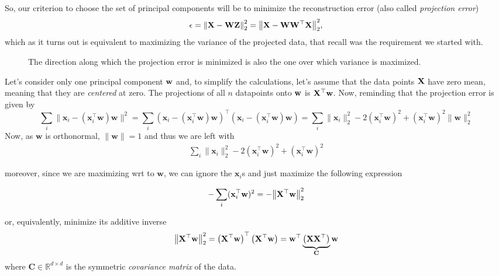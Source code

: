 So, our criterion to choose the set of principal components will be to minimize the reconstruction error (also called \emph{projection error})
\begin{equation}
    \epsilon = \norm{ \vb{X} - \mathbf{W}\mathbf{Z} }_2^2 = \norm{\vb{X} - \vb{W}\vb{W}^{\top} \vb{X}}_2^2,
\end{equation}
which as it turns out is equivalent to maximizing the variance of the projected data, that recall was the requirement we started with.

\begin{figure}[H]
    \centering
    \caption{The direction along which the projection error is minimized is also the one over which variance is maximized.}
\end{figure}

Let's consider only one principal component $\vb{w}$ and, to simplify the calculations, let's assume that the data points $\vb{X}$ have zero mean, meaning that they are \emph{centered} at zero. The projections of all $n$ datapoints onto $\vb{w}$ is $\vb{X}^{\top} \vb{w}$. Now, reminding that the projection error is given by 
\begin{equation}
	\sum_{i} \|\mathbf{x}_i - \left(\mathbf{x}_i^\top \mathbf{w}\right)\mathbf{w}\|^2 = \sum_i (\mathbf{x}_i - \left(\mathbf{x}_i^\top \mathbf{w}\right)\mathbf{w})^\top (\mathbf{x}_i - \left(\mathbf{x}_i^\top \mathbf{w}\right)\mathbf{w}) = \sum_i \| \mathbf{x}_i \|_2^{2} - 2(\mathbf{x}_i^\top \mathbf{w})^2 + (\mathbf{x}_i ^ \top \mathbf{w})^2\| \mathbf{w}\|_2^2
\end{equation}
Now, as $\mathbf{w}$ is orthonormal, $\| \mathbf{w}\| = 1$ and thus we are left with
\begin{align}
	\sum_i \| \mathbf{x}_i \|_2^{2} - 2(\mathbf{x}_i^\top \mathbf{w})^2 + (\mathbf{x}_i ^ \top \mathbf{w})^2 
\end{align}

moreover, since we are maximizing wrt to $\mathbf{w}$, we can ignore the $\mathbf{x}_i$s and just maximize the following expression

\begin{equation}
	- \sum_{i} (\mathbf{x}_i^\top \mathbf{w})^2 = -\norm{\vb{X}^{\top} \vb{\mathbf{w}}}_2^2
\end{equation}

or, equivalently, minimize its additive inverse
\begin{equation}
	\norm{\vb{X}^{\top} \vb{w}}_2^2 = \left( \mathbf{X}^\top \mathbf{w} \right)^\top \left( \mathbf{X}^\top \mathbf{w} \right) = \mathbf{w}^\top \underbrace{\left( \mathbf{X}\mathbf{X}^\top \right)}_{\mathbf{C}} \mathbf{w}
\end{equation}
where $\mathbf{C} \in \mathbb{R}^{d \times d}$ is the symmetric \emph{covariance matrix} of the data. 

